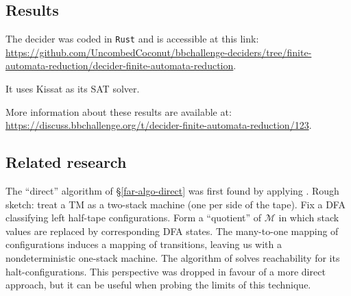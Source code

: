 \subsection{Results}
The decider was coded in \texttt{Rust} and is accessible at this link: \url{https://github.com/UncombedCoconut/bbchallenge-deciders/tree/finite-automata-reduction/decider-finite-automata-reduction}.

It uses Kissat\cite{Biere_2020} as its \textsc{SAT} solver.

More information about these results are available at: \url{https://discuss.bbchallenge.org/t/decider-finite-automata-reduction/123}.

\subsection{Related research}
The ``direct'' algorithm of \S \ref{far-algo-direct} was first found by applying \cite{BEM_1997}.
Rough sketch: treat a TM as a two-stack machine (one per side of the tape).
Fix a DFA classifying left half-tape configurations.
Form a ``quotient'' of $\mathcal{M}$ in which stack values are replaced by corresponding DFA states.
The many-to-one mapping of configurations induces a mapping of transitions, leaving us with a nondeterministic one-stack machine.
The algorithm of \cite{BEM_1997} solves reachability for its halt-configurations.
This perspective was dropped in favour of a more direct approach, but it can be useful when probing the limits of this technique.
